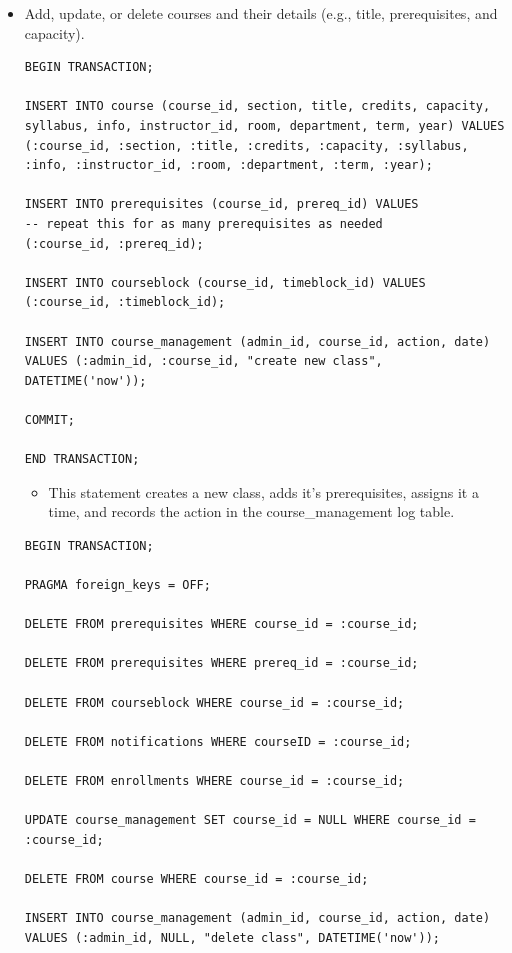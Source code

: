 \documentclass{report}
\begin{document}
\begin{itemize}
    
    \item Add, update, or delete courses and their details (e.g., title, prerequisites, and capacity).
    \begin{lstlisting}
BEGIN TRANSACTION;

INSERT INTO course (course_id, section, title, credits, capacity, syllabus, info, instructor_id, room, department, term, year) VALUES
(:course_id, :section, :title, :credits, :capacity, :syllabus, :info, :instructor_id, :room, :department, :term, :year);

INSERT INTO prerequisites (course_id, prereq_id) VALUES
-- repeat this for as many prerequisites as needed
(:course_id, :prereq_id);

INSERT INTO courseblock (course_id, timeblock_id) VALUES
(:course_id, :timeblock_id);

INSERT INTO course_management (admin_id, course_id, action, date)
VALUES (:admin_id, :course_id, "create new class", DATETIME('now'));

COMMIT;

END TRANSACTION;
    \end{lstlisting}
    \begin{itemize}
        \item This statement creates a new class, adds it's prerequisites, assigns it a time, and records the action in the course\_management log table.
    \end{itemize}
    \begin{lstlisting}
BEGIN TRANSACTION;

PRAGMA foreign_keys = OFF;

DELETE FROM prerequisites WHERE course_id = :course_id;

DELETE FROM prerequisites WHERE prereq_id = :course_id;

DELETE FROM courseblock WHERE course_id = :course_id;

DELETE FROM notifications WHERE courseID = :course_id;

DELETE FROM enrollments WHERE course_id = :course_id;

UPDATE course_management SET course_id = NULL WHERE course_id = :course_id;

DELETE FROM course WHERE course_id = :course_id;

INSERT INTO course_management (admin_id, course_id, action, date)
VALUES (:admin_id, NULL, "delete class", DATETIME('now'));


\end{lstlisting}
\end{itemize}
\end{document}
